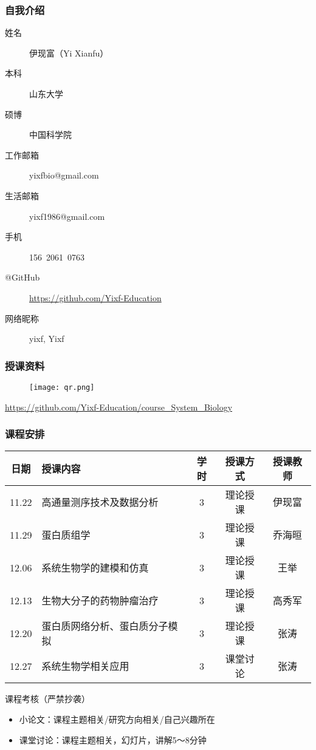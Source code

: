 \begin{frame}
  \frametitle{自我介绍}
    \begin{description}
      \item[姓\qquad 名]伊现富（Yi Xianfu）
      \item[本\qquad 科]山东大学
      \item[硕\qquad 博]中国科学院
      \item[工作邮箱]\alert{yixfbio@gmail.com}
      \item[生活邮箱]yixf1986@gmail.com
      \item[手\qquad 机]\alert{156\ 2061\ 0763}
      \item[@GitHub]\alert{\href{https://github.com/Yixf-Education}{https://github.com/Yixf-Education}}
      \item[网络昵称]yixf, Yixf
    \end{description}
\end{frame}

\begin{frame}
  \frametitle{授课资料}
  \begin{figure}
    \centering
    \texttt{[image: qr.png]}
  \end{figure}
  \begin{center}
  \href{https://github.com/Yixf-Education/course_System_Biology}{https://github.com/Yixf-Education/course\_System\_Biology}
  \end{center}
\end{frame}

\begin{frame}
  \frametitle{课程安排}
  \begin{table}
    \centering
    \begin{tabular}{clccc}
      \hline
      \rowcolor{blue!50}日期 & 授课内容 & 学时 & 授课方式 & 授课教师\\
      \hline
      11.22 & 高通量测序技术及数据分析 & 3 & 理论授课 & 伊现富\\
      11.29 & 蛋白质组学 & 3 & 理论授课 & 乔海晅\\
      12.06 & 系统生物学的建模和仿真 & 3 & 理论授课 & 王举\\
      12.13 & 生物大分子的药物肿瘤治疗 & 3 & 理论授课 & 高秀军\\
      12.20 & 蛋白质网络分析、蛋白质分子模拟 & 3 & 理论授课 & 张涛\\
      12.27 & 系统生物学相关应用 & 3 & 课堂讨论 & 张涛\\
      \hline
    \end{tabular}
  \end{table}
  \vspace{-1em}
  \begin{block}{课程考核（\alert{严禁抄袭}）}
    \begin{itemize}
      \item 小论文：课程主题相关/研究方向相关/自己兴趣所在
      \item 课堂讨论：课程主题相关，幻灯片，讲解5～8分钟
    \end{itemize}
  \end{block}
\end{frame}
